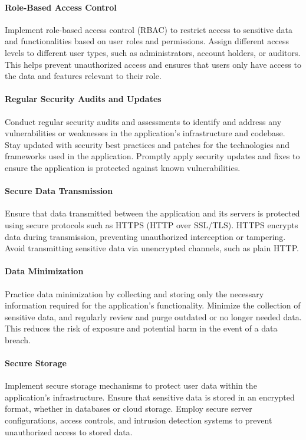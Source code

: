 \paragraph{Role-Based Access Control}
Implement role-based access control (RBAC) to restrict access to sensitive data and 
functionalities based on user roles and permissions. Assign different access levels to different user types, 
such as administrators, account holders, or auditors. This helps prevent unauthorized access and ensures that 
users only have access to the data and features relevant to their role.

\paragraph{Regular Security Audits and Updates}
Conduct regular security audits and assessments to identify and address any 
vulnerabilities or weaknesses in the application's infrastructure and codebase. Stay updated with security best 
practices and patches for the technologies and frameworks used in the application. Promptly apply security updates 
and fixes to ensure the application is protected against known vulnerabilities.

\paragraph{Secure Data Transmission}
Ensure that data transmitted between the application and its servers is protected using 
secure protocols such as HTTPS (HTTP over SSL/TLS). HTTPS encrypts data during transmission, preventing unauthorized 
interception or tampering. Avoid transmitting sensitive data via unencrypted channels, such as plain HTTP.

\paragraph{Data Minimization}
Practice data minimization by collecting and storing only the necessary information required for 
the application's functionality. Minimize the collection of sensitive data, and regularly review and purge outdated 
or no longer needed data. This reduces the risk of exposure and potential harm in the event of a data breach.

\paragraph{Secure Storage}
Implement secure storage mechanisms to protect user data within the application's infrastructure. 
Ensure that sensitive data is stored in an encrypted format, whether in databases or cloud storage. Employ secure 
server configurations, access controls, and intrusion detection systems to prevent unauthorized access to stored data.

